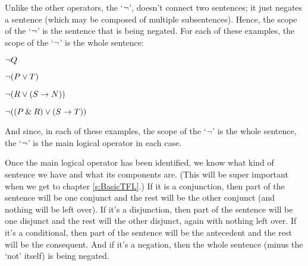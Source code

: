 Unlike the other operators, the `${\neg}$', doesn't connect two sentences; it just negates a sentence (which may be composed of multiple subsentences). Hence, the scope of the `${\neg}$' is the sentence that is being negated. For each of these examples, the scope of the `${\neg}$' is the whole sentence: 

\begin{earg}
\item[] ${\neg} Q$
\item[] ${\neg}(P \vee T)$
\item[] ${\neg}(R \vee (S \rightarrow N))$
\item[] ${\neg}((P \mathbin{\&} R) \vee (S \rightarrow T))$
\end{earg}
And since, in each of these examples, the scope of the `${\neg}$' is the whole sentence, the `${\neg}$' is the main logical operator in each case.


Once the main logical operator has been identified, we know what kind of sentence we have and what its components are. (This will be super important when we get to chapter \ref{s:BasicTFL}.)
If it is a conjunction, then part of the sentence will be one conjunct and the rest will be the other conjunct (and nothing will be left over). If it's a disjunction, then part of the sentence will be one disjunct and the rest will the other disjunct, again with nothing left over. If it's a conditional, then part of the sentence will be the antecedent and the rest will be the consequent. And if it's a negation, then the whole sentence (minus the `not' itself) is being negated.




